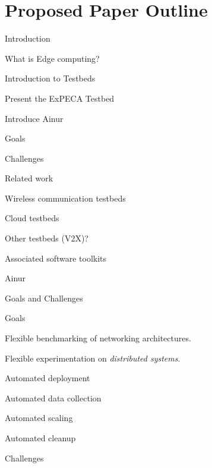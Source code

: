 \section{Proposed Paper Outline}

\begin{outline}
    \item Introduction
    \begin{outline}
        \item What is Edge computing?
        \item Introduction to Testbeds
        \item Present the ExPECA Testbed
        \item Introduce Ainur
        \begin{outline}
            \item Goals
            \item Challenges
        \end{outline}
    \end{outline}
    \item Related work
    \begin{outline}
        \item Wireless communication testbeds
        \item Cloud testbeds
        \item Other testbeds (V2X)?
        \item Associated software toolkits
    \end{outline}
    \item Ainur
    \begin{outline}
        \item Goals and Challenges
        \begin{outline}
            \item Goals
            \begin{outline}
                \item Flexible benchmarking of networking architectures.
                \item Flexible experimentation on \emph{distributed systems}.
                \item Automated deployment
                \item Automated data collection
                \item Automated scaling
                \item Automated cleanup
            \end{outline}
            \item Challenges

\end{outline}
\end{outline}
\end{outline}
